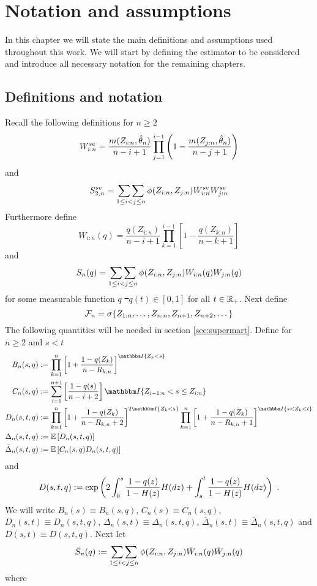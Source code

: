 \chapter{Notation and assumptions} \label{ch:notation}
In this chapter we will state the main definitions and assumptions used throughout this work. We will start by defining the estimator to be considered and introduce all necessary notation for the remaining chapters.
%
\section{Definitions and notation}
Recall the following definitions for $n\geq2$
$$W_{i:n}^{se} = \frac{m(Z_{i:n}, \hat{\theta}_n)}{n-i+1} \prod\limits_{j=1}^{i-1}\left(1-\frac{m(Z_{j:n}, \hat{\theta}_n)}{n-j+1}\right)$$
%
and
$$S_{2,n}^{se} = \mathop{\sum\sum}\limits_{1\leq i<j\leq n}\phi(Z_{i:n}, Z_{j:n})W_{i:n}^{se}W_{j:n}^{se}$$
%
Furthermore define
$$W_{i:n}(q) = \frac{q(Z_{i:n})}{n-i+1}\prod_{k=1}^{i-1}\left[1-\frac{q(Z_{k:n})}{n-k+1}\right]$$
and 
$$S_{n}(q) = \mathop{\sum\sum}\limits_{1\leq i<j\leq n}\phi(Z_{i:n}, Z_{j:n})W_{i:n}(q)W_{j:n}(q)$$
for some measurable function $q$ \st\ $q(t)\in[0,1]$ for all $t\in\mathbb{R}_+$.
%
Next define
$$\mathcal{F}_n = \sigma\{Z_{1:n}, \dots, Z_{n:n}, Z_{n+1}, Z_{n+2}, \dots\}$$
%
The following quantities will be needed in section \ref{sec:supermart}. Define for $n\geq 2$ and $s < t$
\begin{align*}
B_n(s,q) &:= \prod_{k=1}^{n}\left[1+\frac{1-q(Z_{k})}{n-R_{k,n}}\right]^{\I{Z_{k} < s}}\\
C_n(s,q) &:= \sum_{i=1}^{n+1}\left[\frac{1-q(s)}{n-i+2}\right]\I{Z_{i-1:n} < s \leq Z_{i:n}}\\
D_n(s,t,q) &:= \prod_{k=1}^{n} \left[1+\frac{1-q(Z_k)}{n-R_{k,n} +2}\right]^{2\I{Z_k<s}} \prod_{k=1}^{n}\left[1+\frac{1-q(Z_k)}{n-R_ {k,n}+1}\right]^{\I{s < Z_k < t}}\\
\Delta_n(s,t,q) &:= \E\left[D_n(s,t,q) \right]\\
\bar{\Delta}_n(s,t,q) &:= \E\left[C_n(s,q)D_n(s,t,q) \right]
\end{align*}
and
$$D(s,t,q) := \exp\left(2\int_{0}^{s} \frac{1-q(z)}{1-H(z)} H(dz) + \int_{s}^{t} \frac{1-q(z)}{1-H(z)} H(dz)\right)\textrm{ .}$$
We will write $B_n(s) \equiv B_n(s,q)$, $C_n(s) \equiv C_n(s,q)$, $D_n(s,t) \equiv D_n(s,t,q)$, $\Delta_n(s,t) \equiv \Delta_n(s,t,q)$, $\bar\Delta_n(s,t) \equiv \bar\Delta_n(s,t,q)$ and $D(s,t) \equiv D(s,t,q)$. Next let
$$\bar{S}_n(q) := \mathop{\sum\sum}\limits_{1\leq i < j \leq n} \phi(Z_{i:n},Z_{j:n}) \bar{W}_{i:n}(q) \bar{W}_{j:n}(q)$$
where 
